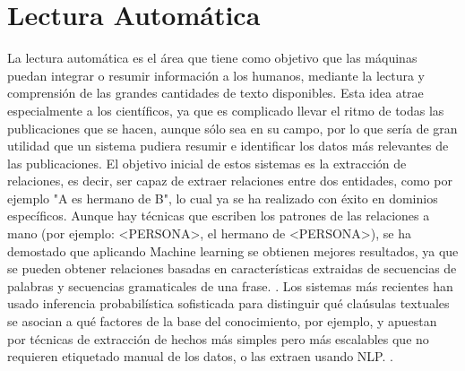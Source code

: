 \section*{Lectura Automática}
La lectura automática es el área que tiene como objetivo que las máquinas puedan integrar o resumir información a los humanos, mediante la lectura y comprensión de las grandes cantidades de texto disponibles. \newline
Esta idea atrae especialmente a los científicos, ya que es complicado llevar el ritmo de todas las publicaciones que se hacen, aunque sólo sea en su campo, por lo que sería de gran utilidad que un sistema pudiera resumir e identificar los datos más relevantes de las publicaciones. 
El objetivo inicial de estos sistemas es la extracción de relaciones, es decir, ser capaz de extraer relaciones entre dos entidades, como por ejemplo "A es hermano de B", lo cual ya se ha realizado con éxito en dominios específicos. Aunque hay técnicas que escriben los patrones de las relaciones a mano (por ejemplo: <PERSONA>, el hermano de <PERSONA>), se ha demostado que aplicando Machine learning se obtienen mejores resultados, ya que se pueden obtener relaciones basadas en características extraidas de secuencias de palabras y secuencias gramaticales de una frase. \citet{culotta2004dependency}.
\newline
Los sistemas más recientes han usado inferencia probabilística sofisticada para distinguir qué claúsulas textuales se asocian a qué factores de la base del conocimiento, por ejemplo,  \citet{niu2012deepdive} y apuestan por técnicas de extracción de hechos más simples pero más escalables que no requieren etiquetado manual de los datos, o las extraen usando NLP. \citet{etzioni2011open}. 

     
